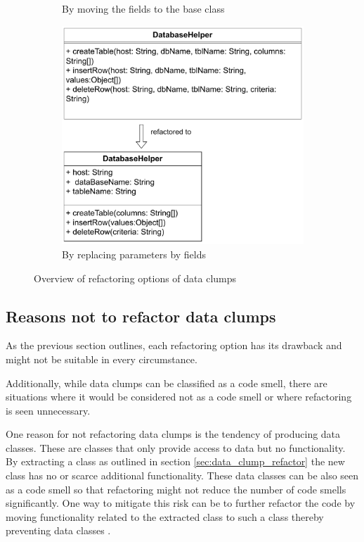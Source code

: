 \begin{figure}
\begin{subfigure}[t]{0.4\columnwidth}
        \caption{By moving the fields to the base class}
        \label{fig:move_fields_up}
    \end{subfigure}
     \begin{subfigure}[t]{0.59\columnwidth}
\includegraphics[width=1\columnwidth]{figures/chapter2/alternative_refactorings_to_fields.drawio.pdf}
\caption{By replacing parameters by fields}
\label{fig:params_to_fields}


    \end{subfigure}
\label{fig:refactoring_options}
\caption{Overview of refactoring options of data clumps}
\end{figure}


\subsection{Reasons not to refactor data clumps}\label{sec:data_clump_not_refactor}
As the previous section  outlines, each refactoring option has its drawback and might not be suitable in every circumstance.

Additionally, while data clumps can be classified as a code smell, there are situations where it would be considered not as a code smell or where refactoring is seen unnecessary. 

One reason for not refactoring data clumps is the tendency of producing data classes. These are classes that only provide access to data but no functionality. By extracting a class as outlined in section \ref{sec:data_clump_refactor} the new class has no or scarce additional functionality. These data classes can be also seen as a code smell so that refactoring might not reduce the number of code smells significantly. One way to mitigate this risk can be to further refactor the code by moving functionality related to the extracted class to such a class thereby preventing data classes \cite{fowler2019refactoring}. 

